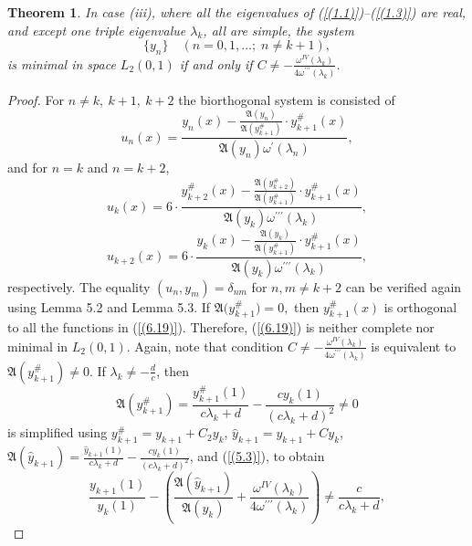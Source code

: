 \documentclass[10pt,a4paper]{amsart}
\newtheorem{thm}{Theorem}[section]
\numberwithin{equation}{section}
\begin{document}
\begin{thm} 
In case (iii), where  all the eigenvalues of (\ref{(1.1)})--(\ref{(1.3)}) are real, and except one triple eigenvalue $\lambda_k$, all are simple, the system
\begin{equation}
  \{ y_n \} \quad (n = 0,1,\ldots;\; n \neq k+1), \label{(6.19)} 
\end{equation}
is minimal in space $L_2(0,1)$ if and only if $C\neq-\frac{\omega^{IV}(\lambda_k)}{4\omega^{\prime\prime\prime}(\lambda_k)}$.
\end{thm}

\begin{proof}
 For $n \ne k,\ k+1,\ k+2$ the biorthogonal system is consisted of
\begin{equation}
u_n(x)=\frac{y_n(x)-\frac{\mathfrak{A}(y_{n})}{\mathfrak{A}(y_{k+1}^{\#})}\cdot y^{\#}_{k+1}(x)}{ \mathfrak{A}(y_{n})\omega^\prime(\lambda_n)}
, \label{(6.20)}
\end{equation}
and for $n = k$ and $n = k+2$,
\begin{equation}
u_k(x)=6\cdot\frac{y^{\#}_{k+2}(x)-\frac{\mathfrak{A}(y^{\#}_{k+2})}{\mathfrak{A}(y^{\#}_{k+1})}\cdot y^{\#}_{k+1}(x)}{ \mathfrak{A}(y_k)\omega^{\prime\prime\prime}(\lambda_k)}
, \label{(6.21)}
\end{equation}
\begin{equation}
u_{k+2}(x)=6\cdot\frac{y_{k}(x)-\frac{\mathfrak{A}(y_{k})}{\mathfrak{A}(y^{\#}_{k+1})}\cdot y^{\#}_{k+1}(x)}{ \mathfrak{A}(y_{k})\omega^{\prime\prime\prime}(\lambda_k)}
, \label{(6.22)}
\end{equation}
respectively.
The equality $(u_n, y_m) = \delta_{nm}$ for $ n,m\neq k+2$ can be verified again using Lemma 5.2 and Lemma 5.3.
If
\(
\mathfrak{A}\bigl(y_{k+1}^{\#}\bigr)=0,
\)
then $y_{k+1}^{\#}(x)$ is orthogonal to 
all the functions in (\ref{(6.19)}). Therefore, (\ref{(6.19)}) is neither complete nor minimal in $L_2(0,1)$.
Again, note that condition $C\neq-\frac{\omega^{IV}(\lambda_k)}{4\omega^{\prime\prime\prime}(\lambda_k)}$ is equivalent to $\mathfrak{A}(y_{k+1}^{\#})\ne 0$. If $\lambda_k\neq-\frac{d}{c}$, then
\begin{equation}
 \mathfrak{A}(y^{\#}_{k+1}) =
\frac{y^{\#}_{k + 1}(1)}{c\lambda_{k}+d} - \frac{cy_{k}(1)}{{(c\lambda_{k}+d)}^{2}}\neq0
 \label{(6.20.1)}
\end{equation}
is simplified using $y_{k+1}^\# = y_{k+1} + C_2 y_k$, $\hat{y}_{k+1}={y}_{k+1}+Cy_k$,
$\mathfrak{A}(\hat{y}_{k+1}) =
\frac{\hat{y}_{k + 1}(1)}{c\lambda_{k}+d} - \frac{cy_{k}(1)}{{(c\lambda_{k}+d)}^{2}}$, 
and (\ref{(5.3)}), to obtain
$$
\frac{{y}_{k+1}(1)}{y_{k}(1)}-\left(\frac{\mathfrak{A}(\hat{y}_{k+1})}{\mathfrak{A}({y}_{k})}+\frac{\omega^{IV}(\lambda_k)}{4\omega^{\prime\prime\prime}(\lambda_k)}\right)\neq \frac{c}{c\lambda_{k}+d}, $$


\end{proof}
\end{document}
